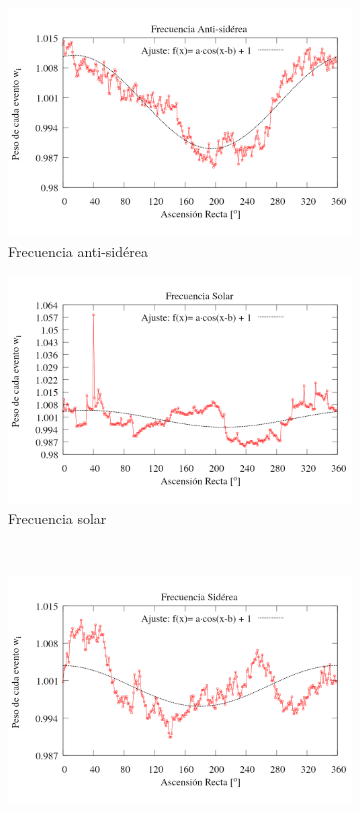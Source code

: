 		
		\begin{figure}[H]
		\begin{subfigure}{.5\textwidth}
			\centering
			\includegraphics[width=\linewidth]{eventos_RA_ajuste_cos_antisiderea_v2.png}
			\caption{Frecuencia anti-sidérea}
			\label{fig:ajuste_antisiderea}
		\end{subfigure}%
		\begin{subfigure}{.5\textwidth}
			\centering
			\includegraphics[width=\linewidth]{eventos_RA_ajuste_cos_solar_v3.png}
			\caption{Frecuencia solar}
			\label{fig:ajuste_solar}
		\end{subfigure}\\
		\centering
		\begin{subfigure}{.5\textwidth}
			\centering
			\includegraphics[width=\linewidth]{eventos_RA_ajuste_cos_siderea_v2.png}

\end{subfigure}
\end{figure}
